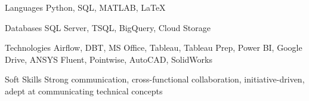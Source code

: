 
\begin{cvskills}
  \cvskill
    {Languages} %
    {Python, SQL, MATLAB, LaTeX} %
  
  \cvskill
    {Databases} %
    {SQL Server, TSQL, BigQuery, Cloud Storage} %
    
  \cvskill
    {Technologies} %
    {Airflow, DBT, MS Office, Tableau, Tableau Prep, Power BI, Google Drive, ANSYS Fluent, Pointwise, AutoCAD, SolidWorks} %
    
  \cvskill
    {Soft Skills} %
    {Strong communication, cross-functional collaboration, initiative-driven, adept at communicating technical concepts}

\end{cvskills}

